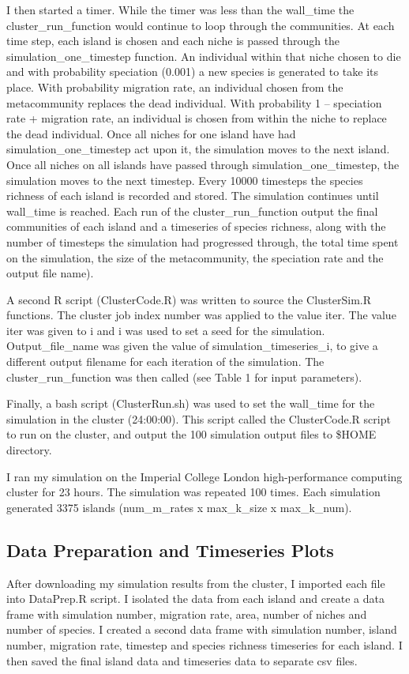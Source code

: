 \documentclass{article}
\begin{document}
I then started a timer. While the timer was less than the wall\_time the cluster\_run\_function would continue to loop through the communities. At each time step, each island is chosen and each niche is passed through the simulation\_one\_timestep function.  An individual within that niche chosen to die and with probability speciation (0.001) a new species is generated to take its place. With probability migration rate, an individual chosen from the metacommunity replaces the dead individual. With probability 1 – speciation rate + migration rate, an individual is chosen from within the niche to replace the dead individual. Once all niches for one island have had simulation\_one\_timestep act upon it, the simulation moves to the next island. Once all niches on all islands have passed through simulation\_one\_timestep, the simulation moves to the next timestep. Every 10000 timesteps the species richness of each island is recorded and stored. The simulation continues until wall\_time is reached. Each run of the cluster\_run\_function output the final communities of each island and a timeseries of species richness, along with the number of timesteps the simulation had progressed through, the total time spent on the simulation, the size of the metacommunity, the speciation rate and the output file name). \bigskip

A second R script (ClusterCode.R) was written to source the ClusterSim.R functions. The cluster job index number was applied to the value iter. The value iter was given to i and i was used to set a seed for the simulation. Output\_file\_name was given the value of simulation\_timeseries\_i, to give a different output filename for each iteration of the simulation. The cluster\_run\_function was then called (see Table 1 for input parameters). \bigskip

Finally, a bash script (ClusterRun.sh) was used to set the wall\_time for the simulation in the cluster (24:00:00). This script called the ClusterCode.R script to run on the cluster, and output the 100 simulation output files to \$HOME directory. \bigskip

I ran my simulation on the Imperial College London high-performance computing cluster for 23 hours. The simulation was repeated 100 times. Each simulation generated 3375 islands (num\_m\_rates x max\_k\_size x max\_k\_num). 

\subsection{Data Preparation and Timeseries Plots}
After downloading my simulation results from the cluster, I imported each file into DataPrep.R script. I isolated the data from each island and create a data frame with simulation number, migration rate, area, number of niches and number of species. I created a second data frame with simulation number, island number, migration rate, timestep and species richness timeseries for each island. I then saved the final island data and timeseries data to separate csv files. \bigskip
\end{document}
